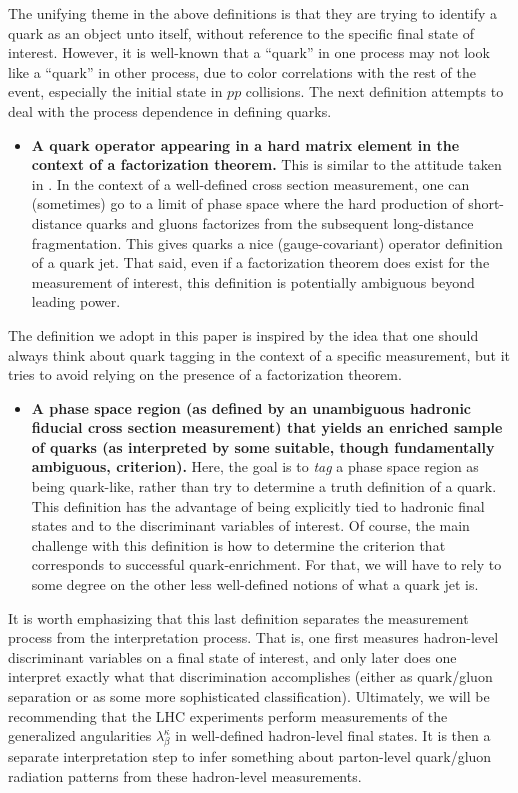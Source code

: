\documentclass[11pt,letterpaper]{article}
\begin{document}
The unifying theme in the above definitions is that they are trying to identify a quark as an object unto itself, without reference to the specific final state of interest.  However, it is well-known that a ``quark'' in one process may not look like a ``quark'' in other process, due to color correlations with the rest of the event, especially the initial state in $pp$ collisions.  The next definition attempts to deal with the process dependence in defining quarks. 
\begin{itemize}
\item \textbf{A quark operator appearing in a hard matrix element in the context of a factorization theorem.}  This is similar to the attitude taken in \cite{}.  In the context of a well-defined cross section measurement, one can (sometimes) go to a limit of phase space where the hard production of short-distance quarks and gluons factorizes from the subsequent long-distance fragmentation.  This gives quarks a nice (gauge-covariant) operator definition of a quark jet.  That said, even if a factorization theorem does exist for the measurement of interest, this definition is potentially ambiguous beyond leading power.
\end{itemize}
The definition we adopt in this paper is inspired by the idea that one should always think about quark tagging in the context of a specific measurement, but it tries to avoid relying on the presence of a factorization theorem.
\begin{itemize}
\item \textbf{A phase space region (as defined by an unambiguous hadronic fiducial cross section measurement) that yields an enriched sample of quarks (as interpreted by some suitable, though fundamentally ambiguous, criterion).}  Here, the goal is to \emph{tag} a phase space region as being quark-like, rather than try to determine a truth definition of a quark.  This definition has the advantage of being explicitly tied to hadronic final states and to the discriminant variables of interest.   Of course, the main challenge with this definition is how to determine the criterion that corresponds to successful quark-enrichment.  For that, we will have to rely to some degree on the other less well-defined notions of what a quark jet is.
\end{itemize}  

It is worth emphasizing that this last definition separates the measurement process from the interpretation process.  That is, one first measures hadron-level discriminant variables on a final state of interest, and only later does one interpret exactly what that discrimination accomplishes (either as quark/gluon separation or as some more sophisticated classification).  Ultimately, we will be recommending that the LHC experiments perform measurements of the generalized angularities $\lambda_\beta^\kappa$ in well-defined hadron-level final states.  It is then a separate interpretation step to infer something about parton-level quark/gluon radiation patterns from these hadron-level measurements.
\end{document}
